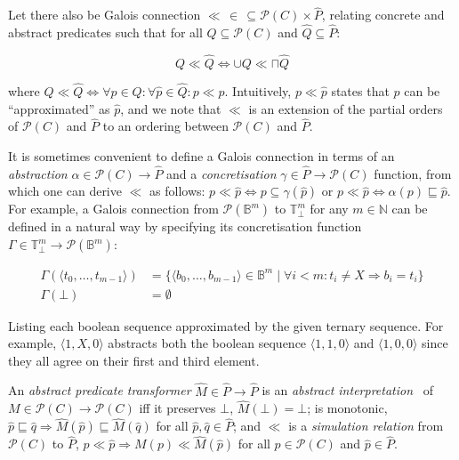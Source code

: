 Let there also be Galois connection $\ll \, \in \, \subseteq \mathcal{P}(C) \times \hat P$, relating concrete and abstract predicates such that for all $Q \subseteq \mathcal{P}(C)$ and $\hat Q \subseteq \hat P$:

\begin{equation*}
Q \ll \hat Q \iff \cup Q \ll \sqcap \hat Q
\end{equation*}

\noindent where $Q \ll \hat Q \iff \forall p \in Q : \forall \hat p \in \hat Q : p \ll \hat p$. Intuitively, $p \ll \hat p$ states that $p$ can be ``approximated'' as $\hat p$, and we note that $\ll$ is an extension of the partial orders of $\mathcal{P}(C)$ and $\hat P$ to an ordering between $\mathcal{P}(C)$ and $\hat P$.

It is sometimes convenient to define a Galois connection in terms of an \textit{abstraction} $\alpha \in \mathcal{P}(C) \rightarrow \hat P$ and a \textit{concretisation} $\gamma \in \hat P \rightarrow \mathcal{P}(C)$ function, from which one can derive $\ll$ as follows: $p \ll \hat p \iff p \subseteq \gamma(\hat p)$ or $p \ll \hat p \iff \alpha (p) \sqsubseteq \hat p$. For example, a Galois connection from $\mathcal{P}(\mathbb{B}^{m})$ to $\mathbb{T}_{\bot}^{m}$ for any $m \in \mathbb{N}$ can be defined in a natural way by specifying its concretisation function $\Gamma \in \mathbb{T}_{\bot}^{m} \rightarrow \mathcal{P}(\mathbb{B}^{m})$:

\begin{align*}
\Gamma ( \langle t_{0},\dots,t_{m-1} \rangle ) &= \{ \langle b_{0},\dots,b_{m-1} \rangle \in \mathbb{B}^{m} \mid \forall i < m : t_{i} \neq X \Rightarrow b_{i} = t_{i} \} \\
\Gamma ( \bot ) &= \emptyset
\end{align*}

\noindent Listing each boolean sequence approximated by the given ternary sequence. For example, $\langle 1,X,0 \rangle$ abstracts both the boolean sequence $\langle 1,1,0 \rangle$ and $\langle 1,0,0 \rangle$ since they all agree on their first and third element.

An \textit{abstract predicate transformer} $\hat M \in \hat P \rightarrow \hat P$ is an \textit{abstract interpretation}~\cite{cousot1996} of $M \in \mathcal{P}(C) \rightarrow \mathcal{P}(C)$ iff it preserves $\bot$, $\hat M(\bot) = \bot$; is monotonic, $\hat p \sqsubseteq \hat q \Rightarrow \hat M (\hat p) \sqsubseteq \hat M (\hat q)$ for all $\hat p, \hat q \in \hat P$; and $\ll$ is a \textit{simulation relation} from $\mathcal{P}(C)$ to $\hat P$, $p \ll \hat p \Rightarrow M (p) \ll \hat M (\hat p)$ for all $p \in \mathcal{P}(C)$ and $\hat p \in \hat P$.


